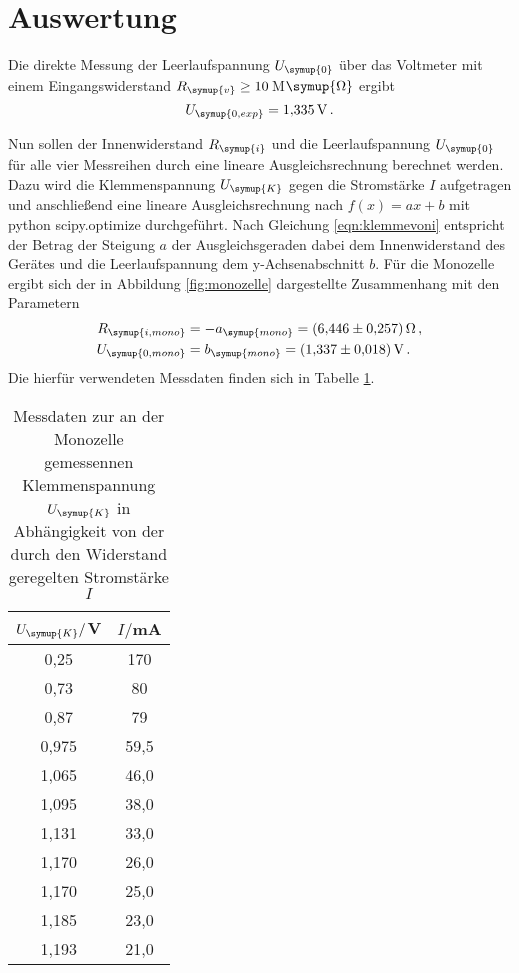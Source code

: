 \section{Auswertung}
\label{sec:Auswertung}

Die direkte Messung der Leerlaufspannung $U_{\symup{0}}$ über das Voltmeter
mit einem Eingangswiderstand $R_{\symup{v}}\geq10$\,M$\symup{\Omega}$ ergibt
\begin{equation}
  U_{\symup{0,exp}} = \SI{1.335}{\volt}\,.
\end{equation}


Nun sollen der Innenwiderstand $R_{\symup{i}}$ und die Leerlaufspannung $U_{\symup{0}}$
für alle vier Messreihen durch eine lineare Ausgleichsrechnung berechnet werden.
Dazu wird die Klemmenspannung $U_{\symup{K}}$ gegen die Stromstärke $I$ aufgetragen
und anschließend eine lineare Ausgleichsrechnung nach $f(x)=ax+b$ mit python scipy.optimize durchgeführt.
Nach Gleichung \eqref{eqn:klemmevoni} entspricht der Betrag der Steigung $a$ der Ausgleichsgeraden dabei dem Innenwiderstand des
Gerätes und die Leerlaufspannung dem y-Achsenabschnitt $b$. Für die Monozelle
ergibt sich der in Abbildung \ref{fig:monozelle} dargestellte Zusammenhang mit den
Parametern
\begin{align}
  R_{\symup{i,mono}}&=-a_{\symup{mono}} = \SI{6.446(0257)}{\ohm} \,, \\
  U_{\symup{0,mono}}&=b_{\symup{mono}} = \SI{1.337(0018)}{\volt} \,.
\end{align}
Die hierfür verwendeten Messdaten finden sich in Tabelle \ref{tab:monozelle}.

\begin{table}
  \centering
  \caption{Messdaten zur an der Monozelle gemessennen Klemmenspannung $U_{\symup{K}}$
  in Abhängigkeit von der durch den Widerstand geregelten Stromstärke $I$}
  \label{tab:monozelle}
  \begin{tabular}{c c}
    \toprule
    $U_{\symup{K}}/$V & $I/$mA\\
    \midrule
    0,25	&  170\\
    0,73	&  80\\
    0,87	&  79\\
    0,975	& 59,5\\
    1,065	& 46,0\\
    1,095	& 38,0\\
    1,131	& 33,0\\
    1,170	& 26,0\\
    1,170	& 25,0\\
    1,185	& 23,0\\
    1,193	& 21,0\\
    \bottomrule
  \end{tabular}
\end{table}

